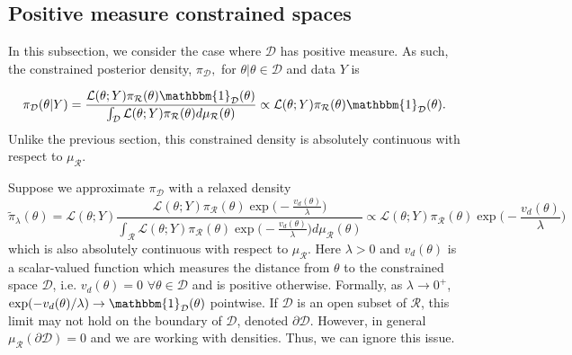 \documentclass[10pt,fleqn]{article}
\newcommand{\leo}[1]{{\color{blue}{Leo: #1}}}
\DeclareMathOperator{\1}{\mathbbm{1}}
\begin{document}
{%
%

\subsection{Positive measure constrained spaces}
\label{SEC:Positive_measure_methods}
In this subsection, we consider the case where $\mathcal{D}$ has positive measure.  As such, the constrained posterior density, $\pi_\mathcal{D},$ for $\theta|\theta \in \mathcal{D}$ and data $Y$ is 

$$\pi_\mathcal{D}(\theta|Y) = \frac{\mathcal{L}(\theta; Y) \pi_\mathcal{R}(\theta)\mathbbm{1}_\mathcal{D}(\theta)}{\int_\mathcal{D} \mathcal{L}(\theta; Y) \pi_\mathcal{R}(\theta)d\mu_\mathcal{R}(\theta)}\propto \mathcal{L}(\theta; Y) \pi_\mathcal{R}(\theta)\mathbbm{1}_\mathcal{D}(\theta). $$
Unlike the previous section, this constrained density is absolutely continuous with respect to $\mu_\mathcal{R}$.  

Suppose we approximate $\pi_\mathcal{D}$ with a relaxed density $$\tilde{\pi}_\lambda(\theta) = \mathcal{L}(\theta; Y) \frac{\mathcal{L}(\theta; Y)\pi_\mathcal{R}(\theta)\exp\big(-\frac{v_d(\theta)}{\lambda}\big)}{\int_{\mathcal{R}}\mathcal{L}(\theta; Y) \pi_\mathcal{R}(\theta)\exp\big(-\frac{v_d(\theta)}{\lambda}\big) d\mu_\mathcal{R}(\theta)} \propto \mathcal{L}(\theta; Y) \pi_\mathcal{R}(\theta)\exp\big(-\frac{v_d(\theta)}{\lambda}\big)$$
which is also absolutely continuous with respect to $\mu_\mathcal{R}.$
Here $\lambda >0$ and $v_d(\theta)$ is a scalar-valued function which measures the distance from $\theta$ to the constrained space $\mathcal{D}$, i.e. $v_d(\theta) = 0 $ $\forall \theta \in \mathcal{D}$ and is positive otherwise.  Formally, as $\lambda \to 0^+$, $\exp(-v_d(\theta)/\lambda) \to \mathbbm{1}_\mathcal{D}(\theta)$ pointwise.  If $\mathcal{D}$ is an open subset of $\mathcal{R}$, this limit may not hold on the boundary of $\mathcal{D}$, denoted $\partial \mathcal{D}$.  However, in general $\mu_\mathcal{R}(\partial \mathcal{D}) = 0$ and we are working with densities. Thus, we can ignore this issue.

}
\end{document}

